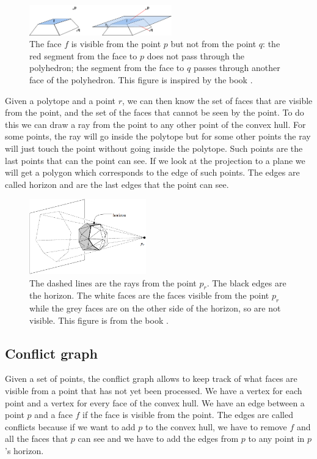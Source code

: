 \documentclass{article}
\begin{document}
\begin{figure}[h]
\centering
\includegraphics[width=0.55\textwidth]{higher_dim/threedim_visibility.png}
\caption{\label{fig:higher_dimensions_visibility} The face $f$ is visible from the point $p$ but not from the point $q$: the red segment from the face to $p$ does not pass through the polyhedron; the segment from the face to $q$ passes through another face of the polyhedron. This figure is inspired by the book \cite{computgeombook}.}
\end{figure}

Given a polytope and a point $r$, we can then know the set of faces that are visible from the point, and the set of the faces that cannot be seen by the point. To do this we can draw a ray from the point to any other point of the convex hull. For some points, the ray will go inside the polytope but for some other points the ray will just touch the point without going inside the polytope. Such points are the last points that can the point can see. If we look at the projection to a plane we will get a polygon which corresponds to the edge of such points. The edges are called horizon and are the last edges that the point can see.

\begin{figure}[h]
\centering
\includegraphics[width=0.45\textwidth]{higher_dim/threedim_visibility_horizon.png}
\caption{\label{fig:higher_dimensions_horizon} The dashed lines are the rays from the point $p_r$. The black edges are the horizon. The white faces are the faces visible from the point $p_r$ while the grey faces are on the other side of the horizon, so are not visible. This figure is from the book \cite{computgeombook}.}
\end{figure}

\newpage
\subsection{Conflict graph}
Given a set of points, the conflict graph allows to keep track of what faces are visible from a point that has not yet been processed. We have a vertex for each point and a vertex for every face of the convex hull. We have an edge between a point $p$ and a face $f$ if the face is visible from the point. The edges are called conflicts because if we want to add $p$ to the convex hull, we have to remove $f$ and all the faces that $p$ can see and we have to add the edges from $p$ to any point in $p$'s horizon.
\end{document}
